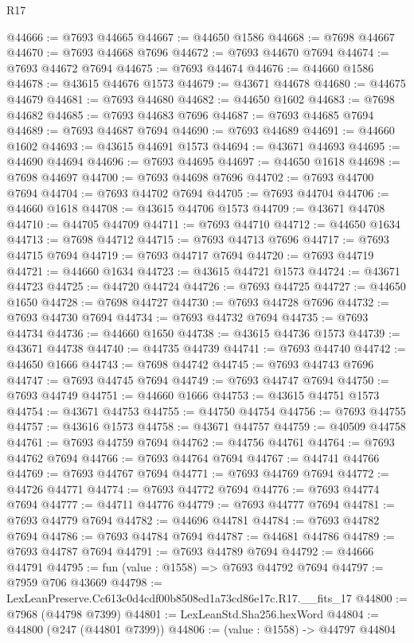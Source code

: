 \begin{lexlean}{R17}
\begin{coremodule}
@44666 := @7693 @44665
@44667 := @44650 @1586
@44668 := @7698 @44667
@44670 := @7693 @44668 @7696
@44672 := @7693 @44670 @7694
@44674 := @7693 @44672 @7694
@44675 := @7693 @44674
@44676 := @44660 @1586
@44678 := @43615 @44676 @1573
@44679 := @43671 @44678
@44680 := @44675 @44679
@44681 := @7693 @44680
@44682 := @44650 @1602
@44683 := @7698 @44682
@44685 := @7693 @44683 @7696
@44687 := @7693 @44685 @7694
@44689 := @7693 @44687 @7694
@44690 := @7693 @44689
@44691 := @44660 @1602
@44693 := @43615 @44691 @1573
@44694 := @43671 @44693
@44695 := @44690 @44694
@44696 := @7693 @44695
@44697 := @44650 @1618
@44698 := @7698 @44697
@44700 := @7693 @44698 @7696
@44702 := @7693 @44700 @7694
@44704 := @7693 @44702 @7694
@44705 := @7693 @44704
@44706 := @44660 @1618
@44708 := @43615 @44706 @1573
@44709 := @43671 @44708
@44710 := @44705 @44709
@44711 := @7693 @44710
@44712 := @44650 @1634
@44713 := @7698 @44712
@44715 := @7693 @44713 @7696
@44717 := @7693 @44715 @7694
@44719 := @7693 @44717 @7694
@44720 := @7693 @44719
@44721 := @44660 @1634
@44723 := @43615 @44721 @1573
@44724 := @43671 @44723
@44725 := @44720 @44724
@44726 := @7693 @44725
@44727 := @44650 @1650
@44728 := @7698 @44727
@44730 := @7693 @44728 @7696
@44732 := @7693 @44730 @7694
@44734 := @7693 @44732 @7694
@44735 := @7693 @44734
@44736 := @44660 @1650
@44738 := @43615 @44736 @1573
@44739 := @43671 @44738
@44740 := @44735 @44739
@44741 := @7693 @44740
@44742 := @44650 @1666
@44743 := @7698 @44742
@44745 := @7693 @44743 @7696
@44747 := @7693 @44745 @7694
@44749 := @7693 @44747 @7694
@44750 := @7693 @44749
@44751 := @44660 @1666
@44753 := @43615 @44751 @1573
@44754 := @43671 @44753
@44755 := @44750 @44754
@44756 := @7693 @44755
@44757 := @43616 @1573
@44758 := @43671 @44757
@44759 := @40509 @44758
@44761 := @7693 @44759 @7694
@44762 := @44756 @44761
@44764 := @7693 @44762 @7694
@44766 := @7693 @44764 @7694
@44767 := @44741 @44766
@44769 := @7693 @44767 @7694
@44771 := @7693 @44769 @7694
@44772 := @44726 @44771
@44774 := @7693 @44772 @7694
@44776 := @7693 @44774 @7694
@44777 := @44711 @44776
@44779 := @7693 @44777 @7694
@44781 := @7693 @44779 @7694
@44782 := @44696 @44781
@44784 := @7693 @44782 @7694
@44786 := @7693 @44784 @7694
@44787 := @44681 @44786
@44789 := @7693 @44787 @7694
@44791 := @7693 @44789 @7694
@44792 := @44666 @44791
@44795 := fun (value : @1558) => @7693 @44792 @7694
@44797 := @7959 @706 @43669
@44798 := LexLeanPreserve.Cc613c0d4cdf00b8508ed1a73cd86e17c.R17.__fits_17
@44800 := @7968 (@44798 @7399)
@44801 := LexLeanStd.Sha256.hexWord
@44804 := @44800 (@247 (@44801 @7399))
@44806 := (value : @1558) -> @44797 @44804

\end{coremodule}
\end{lexlean}
